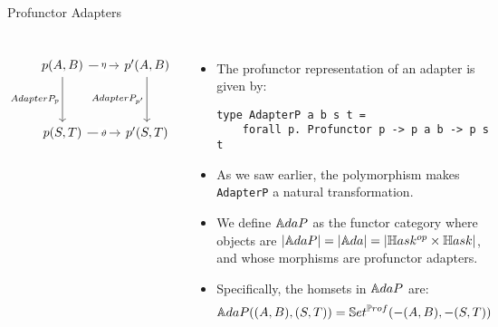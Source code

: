 \begin{frame}[fragile]{Profunctor Adapters}
	\begin{columns}
			\[\begin{tikzcd}
				{p(A,B)} & {p'(A,B)} \\
				\\
				{p(S,T)} & {p'(S,T)}
				\arrow["\eta"{description}, from=1-1, to=1-2]
				\arrow["{AdapterP_p}"', from=1-1, to=3-1]
				\arrow["{AdapterP_{p'}}"', from=1-2, to=3-2]
				\arrow["\vartheta"{description}, from=3-1, to=3-2]
			\end{tikzcd}\]
		\begin{itemize}
			\item The profunctor representation of an adapter is given by:
			\begin{lstlisting}
type AdapterP a b s t =
	forall p. Profunctor p -> p a b -> p s t
			\end{lstlisting}
			\pause\item As we saw earlier, the polymorphism makes \texttt{AdapterP} a natural transformation.
			\pause\item We define $\mathbb{A}daP$ as the functor category where objects are $|\mathbb{A}daP| = |{\mathbb{A}da}| = |\mathbb{H}ask^{op} \times \mathbb{H}ask|$, and whose morphisms are profunctor adapters.
			\pause\item Specifically, the homsets in $\mathbb{A}daP$ are:
			\begin{align*}
				\mathbb{A}daP ((A,B),(S,T)) &= \mathbb{S}et^{\mathbb{P}rof}(-(A, B), -(S, T))\\
			\end{align*}
		\end{itemize}
	\end{columns}
\end{frame}
\iffalse
